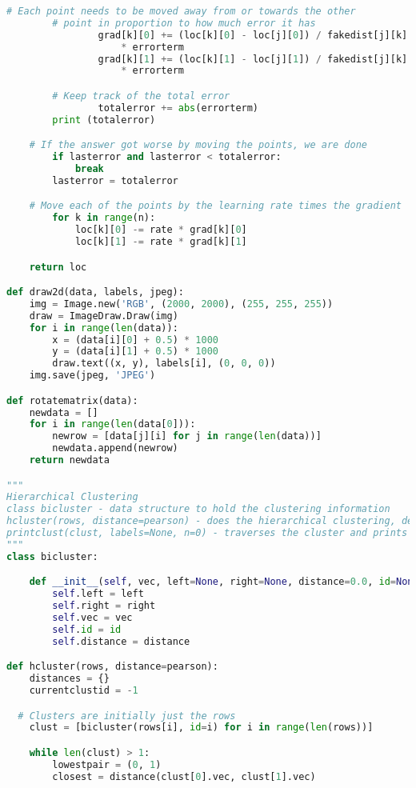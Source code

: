 \documentclass[12pt]{article}
\begin{document}
\begin{lstlisting}[language=Python, caption=three.py , label=2nd:copy]
        # Each point needs to be moved away from or towards the other
        # point in proportion to how much error it has
                grad[k][0] += (loc[k][0] - loc[j][0]) / fakedist[j][k] \
                    * errorterm
                grad[k][1] += (loc[k][1] - loc[j][1]) / fakedist[j][k] \
                    * errorterm

        # Keep track of the total error
                totalerror += abs(errorterm)
        print (totalerror)

    # If the answer got worse by moving the points, we are done
        if lasterror and lasterror < totalerror:
            break
        lasterror = totalerror

    # Move each of the points by the learning rate times the gradient
        for k in range(n):
            loc[k][0] -= rate * grad[k][0]
            loc[k][1] -= rate * grad[k][1]

    return loc

def draw2d(data, labels, jpeg):
    img = Image.new('RGB', (2000, 2000), (255, 255, 255))
    draw = ImageDraw.Draw(img)
    for i in range(len(data)):
        x = (data[i][0] + 0.5) * 1000
        y = (data[i][1] + 0.5) * 1000
        draw.text((x, y), labels[i], (0, 0, 0))
    img.save(jpeg, 'JPEG')

def rotatematrix(data):
    newdata = []
    for i in range(len(data[0])):
        newrow = [data[j][i] for j in range(len(data))]
        newdata.append(newrow)
    return newdata

"""
Hierarchical Clustering
class bicluster - data structure to hold the clustering information
hcluster(rows, distance=pearson) - does the hierarchical clustering, default distance function is pearson()
printclust(clust, labels=None, n=0) - traverses the cluster and prints an ASCII text representation
"""      
class bicluster:

    def __init__(self, vec, left=None, right=None, distance=0.0, id=None,):
        self.left = left
        self.right = right
        self.vec = vec
        self.id = id
        self.distance = distance

def hcluster(rows, distance=pearson):
    distances = {}
    currentclustid = -1

  # Clusters are initially just the rows
    clust = [bicluster(rows[i], id=i) for i in range(len(rows))]

    while len(clust) > 1:
        lowestpair = (0, 1)
        closest = distance(clust[0].vec, clust[1].vec)


\end{lstlisting}
\end{document}
